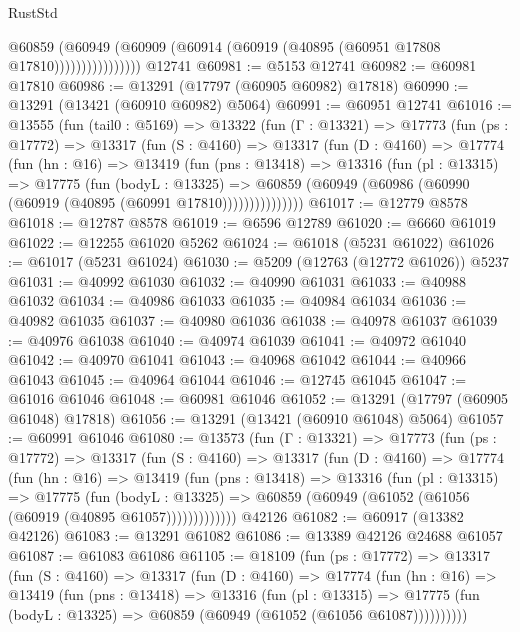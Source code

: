 \begin{lexlean}{RustStd}
\begin{coremodule}
                      @60859
                        (@60949
                          (@60909 (@60914 (@60919 (@40895 (@60951 @17808 @17810))))))))))))))))
    @12741
@60981 := @5153 @12741
@60982 := @60981 @17810
@60986 := @13291 (@17797 (@60905 @60982) @17818)
@60990 := @13291 (@13421 (@60910 @60982) @5064)
@60991 := @60951 @12741
@61016 := @13555
    (fun (tail0 : @5169) =>
    @13322
      (fun (Γ : @13321) =>
      @17773
        (fun (ps : @17772) =>
        @13317
          (fun (S : @4160) =>
          @13317
            (fun (D : @4160) =>
            @17774
              (fun (hn : @16) =>
              @13419
                (fun (pns : @13418) =>
                @13316
                  (fun (pl : @13315) =>
                  @17775
                    (fun (bodyL : @13325) =>
                    @60859 (@60949 (@60986 (@60990 (@60919 (@40895 (@60991 @17810)))))))))))))))
@61017 := @12779 @8578
@61018 := @12787 @8578
@61019 := @6596 @12789
@61020 := @6660 @61019
@61022 := @12255 @61020 @5262
@61024 := @61018 (@5231 @61022)
@61026 := @61017 (@5231 @61024)
@61030 := @5209 (@12763 (@12772 @61026)) @5237
@61031 := @40992 @61030
@61032 := @40990 @61031
@61033 := @40988 @61032
@61034 := @40986 @61033
@61035 := @40984 @61034
@61036 := @40982 @61035
@61037 := @40980 @61036
@61038 := @40978 @61037
@61039 := @40976 @61038
@61040 := @40974 @61039
@61041 := @40972 @61040
@61042 := @40970 @61041
@61043 := @40968 @61042
@61044 := @40966 @61043
@61045 := @40964 @61044
@61046 := @12745 @61045
@61047 := @61016 @61046
@61048 := @60981 @61046
@61052 := @13291 (@17797 (@60905 @61048) @17818)
@61056 := @13291 (@13421 (@60910 @61048) @5064)
@61057 := @60991 @61046
@61080 := @13573
    (fun (Γ : @13321) =>
    @17773
      (fun (ps : @17772) =>
      @13317
        (fun (S : @4160) =>
        @13317
          (fun (D : @4160) =>
          @17774
            (fun (hn : @16) =>
            @13419
              (fun (pns : @13418) =>
              @13316
                (fun (pl : @13315) =>
                @17775
                  (fun (bodyL : @13325) =>
                  @60859 (@60949 (@61052 (@61056 (@60919 (@40895 @61057)))))))))))))
    @42126
@61082 := @60917 (@13382 @42126)
@61083 := @13291 @61082
@61086 := @13389 @42126 @24688 @61057
@61087 := @61083 @61086
@61105 := @18109
    (fun (ps : @17772) =>
    @13317
      (fun (S : @4160) =>
      @13317
        (fun (D : @4160) =>
        @17774
          (fun (hn : @16) =>
          @13419
            (fun (pns : @13418) =>
            @13316
              (fun (pl : @13315) =>
              @17775 (fun (bodyL : @13325) => @60859 (@60949 (@61052 (@61056 @61087))))))))))

\end{coremodule}
\end{lexlean}
